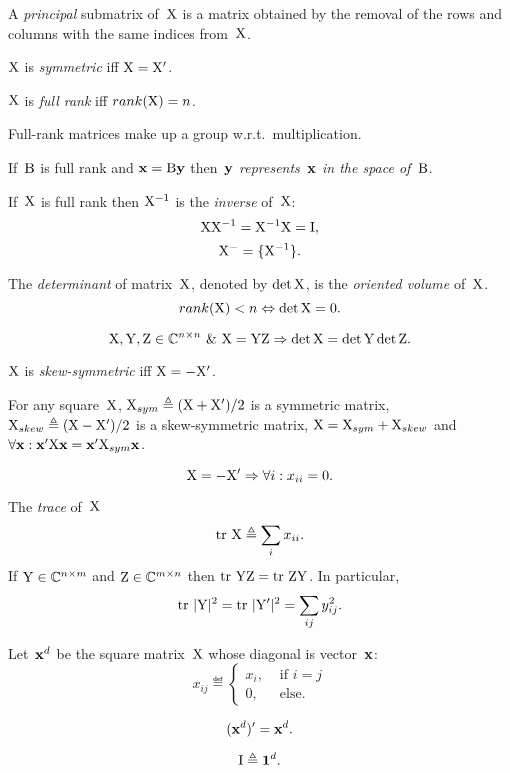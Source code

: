 \documentclass[10pt,a4paper]{article}
\theoremstyle{plain} \newtheorem{Lem}{Lemma}
\begin{document}
A {\em principal} submatrix of~$\mathrm X$ is a matrix obtained by the removal of the rows and columns with the same indices from~$\mathrm X$.

$\mathrm X$ is {\em symmetric} iff $\mathrm X = \mathrm X'$.

$\mathrm X$ is {\em full rank} iff $rank(\mathrm X) = n$.

Full-rank matrices make up a group w.r.t.~multiplication.

If~$\mathrm B$ is full rank and $\mathbf x = \mathrm B \mathbf y$ then~$\mathbf y$ {\em represents~$\mathbf x$ in the space of~$\mathrm B$}.

If~$\mathrm X$ is full rank then $\mathrm X^{-1}$ is the {\em inverse} of~$\mathrm X$:
$$ \mathrm X \mathrm X^{-1} = \mathrm X^{-1} \mathrm X = \mathrm I, $$
$$ \mathrm X^- = \{\mathrm X^{-1}\} . $$

The {\em determinant} of matrix~$\mathrm X$, denoted by $\det \mathrm X$, is the {\em oriented volume} of~$\mathrm X$.
$$ rank (\mathrm X) < n \Leftrightarrow \det \mathrm X = 0. $$

$$ \mathrm X, \mathrm Y, \mathrm Z \in \mathbb C^{n \times n} \ \& \  \mathrm X = \mathrm Y \mathrm Z \Rightarrow \det \mathrm X = \det \mathrm Y \det \mathrm Z. $$

$\mathrm X$ is {\em skew-symmetric} iff $\mathrm X = - \mathrm X'$.

For any square~$\mathrm X$,
$\mathrm X_{sym} \triangleq (\mathrm X + \mathrm X') / 2$ is a symmetric matrix,
$\mathrm X_{skew} \triangleq (\mathrm X - \mathrm X') / 2$ is a skew-symmetric matrix,
$\mathrm X = \mathrm X_{sym} + \mathrm X_{skew}$
and $\forall \mathbf x : \mathbf x' \mathrm X \mathbf x = \mathbf x' \mathrm X_{sym} \mathbf x$.

$$ \mathrm X = - \mathrm X' \Rightarrow \forall i : x_{ii} = 0. $$

The {\em trace} of~$\mathrm X$
$$\mathrm {tr} \  \mathrm X \triangleq \sum_i x_{ii}.$$
If $\mathrm Y \in \mathbb C^{n \times m}$ and $\mathrm Z \in \mathbb C^{m \times n}$ then $\mathrm {tr} \  \mathrm Y \mathrm Z = \mathrm {tr} \  \mathrm Z \mathrm Y$.
In particular,
$$ \mathrm {tr} \  |\mathrm Y|^2 = \mathrm {tr} \  |\mathrm Y'|^2 = \sum_{ij} y^2_{ij}. $$

Let~$\mathbf x^d$ be the square matrix~$\mathrm X$ whose diagonal is vector~$\mathbf x$:
\begin{equation*}
x_{ij} \eqdef
  \begin{cases}
    x_i, &\text{ if } i = j\\
    0,   &\text{ else.}
  \end{cases}
\end{equation*}

$$ (\mathbf x^d)' = \mathbf x^d. $$

$$ \mathrm I \triangleq \mathbf 1^d. $$
\end{document}
